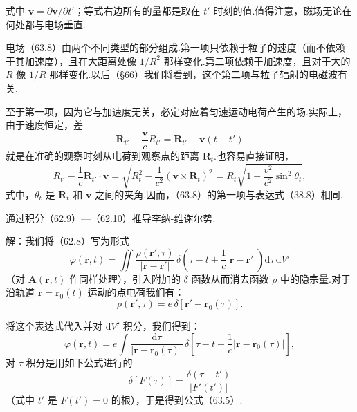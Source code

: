式中 $\dot{\boldsymbol{v}}=\partial\boldsymbol{v}/\partial t'$；等式右边所有的量都是取在 $t'$ 时刻的值.值得注意，磁场无论在何处都与电场垂直.

电场（63.8）由两个不同类型的部分组成.第一项只依赖于粒子的速度（而不依赖于其加速度），且在大距离处像 $1/R^2$ 那样变化.第二项依赖于加速度，且对于大的 $R$ 像 $1/R$ 那样变化.以后（§66）我们将看到，这个第二项与粒子辐射的电磁波有关.

至于第一项，因为它与加速度无关，必定对应着匀速运动电荷产生的场.实际上，由于速度恒定，差
\begin{equation*}
  \boldsymbol{R}_{t'}-\frac{\boldsymbol{v}}{c}R_{t'}
  =\boldsymbol{R}_{t'}-\boldsymbol{v}(t-t')
\end{equation*}
就是在准确的观察时刻从电荷到观察点的距离 $\boldsymbol{R}_t$.也容易直接证明，
\begin{equation*}
  R_{t'}-\frac{1}{c}\boldsymbol{R}_{t'}\cdot\boldsymbol{v}
  =\sqrt{R_t^2-\frac{1}{c^2}(\boldsymbol{v}\times\boldsymbol{R}_t)^2}
  =R_t\sqrt{1-\frac{v^2}{c^2}\sin^2\theta_t},
\end{equation*}
式中，$\theta_t$ 是 $\boldsymbol{R}_t$ 和 $\boldsymbol{v}$ 之间的夹角.因而，（63.8）的第一项与表达式（38.8）相同.

\begin{xiti}

\quad 通过积分（62.9）—（62.10）推导李纳-维谢尔势.

解：我们将（62.8）写为形式
\begin{equation*}
  \varphi(\boldsymbol{r},t)=\iint
  \frac{\rho(\boldsymbol{r}',\tau)}{|\boldsymbol{r}-\boldsymbol{r}'|}
  \,\delta\left(\tau-t+\frac{1}{c}|\boldsymbol{r}-\boldsymbol{r}'|\right)
  \mathrm{d}\tau\,\mathrm{d}V'
\end{equation*}
（对 $\boldsymbol{A}(\boldsymbol{r},t)$ 作同样处理），引入附加的 $\delta$ 函数从而消去函数 $\rho$ 中的隐宗量.对于沿轨道 $\boldsymbol{r}=\boldsymbol{r}_0(t)$ 运动的点电荷我们有：
\begin{equation*}
  \rho(\boldsymbol{r}',\tau)=e\,\delta[\boldsymbol{r}'-\boldsymbol{r}_0(\tau)].
\end{equation*}

将这个表达式代入并对 $\mathrm{d}V'$ 积分，我们得到：
\begin{equation*}
  \varphi(\boldsymbol{r},t)=e\int
  \frac{\mathrm{d}\tau}{|\boldsymbol{r}-\boldsymbol{r}_0(\tau)|}\,
  \delta\left[\tau-t+\frac{1}{c}|\boldsymbol{r}-\boldsymbol{r}_0(\tau)|\right],
\end{equation*}
对 $\tau$ 积分是用如下公式进行的
\begin{equation*}
  \delta[F(\tau)]=\frac{\delta(\tau-t')}{|F'(t')|}
\end{equation*}
（式中 $t'$ 是 $F(t')=0$ 的根），于是得到公式（63.5）.

\end{xiti}

